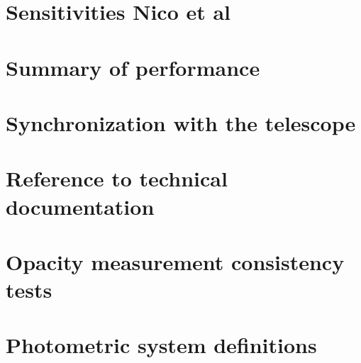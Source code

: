 \documentclass[a4paper, 11pt]{article} %
\begin{document}
\clearpage
\section{Sensitivities {\color{blue} Nico et al} }
\label{se:nefd}



\clearpage
\section{Summary of performance}
\label{se:summary}


\clearpage
\appendix

  \section{Synchronization with the telescope}
  \label{ap:synchro}
  
  
  \section{Reference to technical documentation}
  \label{ap:doc}
  

  \section{Opacity measurement consistency tests}
  \label{ap:opacity}
  

  \section{Photometric system definitions}
  
  \label{ap:cal_HA}

  
  

\clearpage

%



\end{document}
